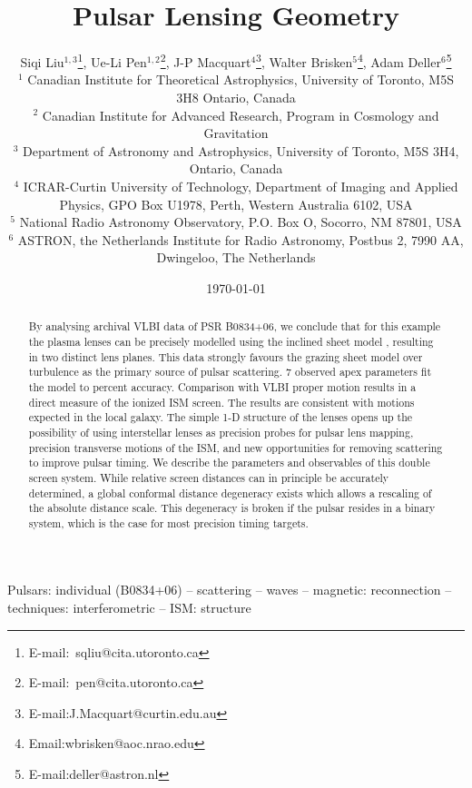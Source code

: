 \documentclass[useAMS,usenatbib]{mn2e}
\begin{document}
\title[Lensing Geometry]{
Pulsar Lensing Geometry
}

\author[Liu et al]{Siqi Liu$^{1,3}$\thanks{E-mail:\ sqliu@cita.utoronto.ca}, Ue-Li
  Pen$^{1,2}$\thanks{E-mail:\ pen@cita.utoronto.ca}, J-P Macquart$^{4}$\thanks{E-mail:J.Macquart@curtin.edu.au},
  Walter Brisken$^{5}$\thanks{Email:wbrisken@aoc.nrao.edu}, Adam Deller$^{6}$\thanks{E-mail:deller@astron.nl}\\
 $^1$ Canadian Institute for Theoretical Astrophysics, University of Toronto, M5S 3H8 Ontario, Canada \\
$^2$ Canadian Institute for Advanced Research, Program in Cosmology
and Gravitation\\
$^3$ Department of Astronomy and Astrophysics, University of Toronto, M5S 3H4, Ontario, Canada\\
$^4$ ICRAR-Curtin University of Technology, Department of Imaging and Applied Physics, GPO Box U1978, Perth, Western Australia 6102, USA \\
$^5$ National Radio Astronomy Observatory, P.O. Box O, Socorro, NM 87801, USA\\
$^6$ ASTRON, the Netherlands Institute for Radio Astronomy, Postbus 2, 7990 AA, Dwingeloo, The Netherlands\\
}

\date{\today}

\pagerange{\pageref{firstpage}--\pageref{lastpage}} 

\maketitle
\label{firstpage}
\begin{abstract}
By analysing archival VLBI data of PSR
B0834+06, we conclude that for this example the plasma lenses can be
precisely modelled using the inclined sheet model \citep{2014MNRAS.442.3338P},
resulting in two distinct lens planes.  This data strongly favours the
grazing sheet model over turbulence as the primary source of
pulsar scattering.  7 observed apex parameters fit the model to
percent accuracy. Comparison with VLBI proper motion results in a
direct measure of the ionized ISM screen.  The results are consistent
with motions expected in the local galaxy.
The simple 1-D structure of the lenses opens up
the possibility of using interstellar lenses as precision probes for
pulsar lens mapping, precision transverse motions of the ISM, and new
opportunities for removing scattering to 
improve pulsar timing.
We describe the parameters and observables of this double screen
system.  While relative screen distances can in principle be
accurately determined,
a global conformal distance degeneracy exists which allows a rescaling
of the absolute distance scale.  This degeneracy is broken if the
pulsar resides in a binary system, which is the case for most
precision timing targets.

\end{abstract}
\begin{keywords}
Pulsars: individual (B0834+06) -- scattering -- waves -- magnetic: reconnection -- techniques: interferometric -- ISM: structure 
\end{keywords}
\end{document}
